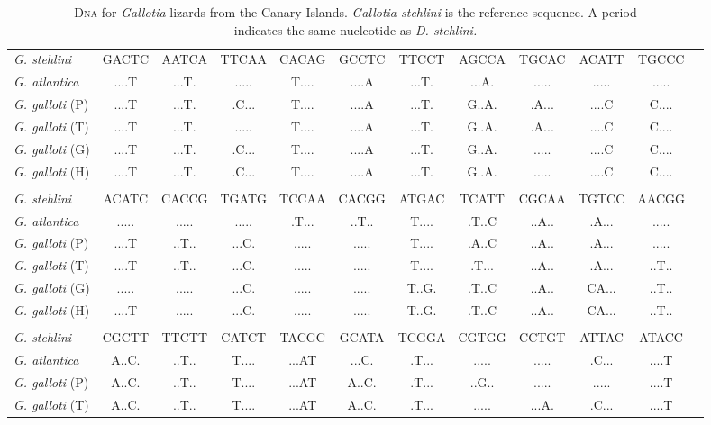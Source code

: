 \documentclass[12pt, hidelinks]{exam}
\begin{document}
\begin{landscape}

{\fontsize{11pt}{13pt}\selectfont
\dnatable
\begin{longtable}[l]{lccccccccccc}
\caption{D\textsc{na} for \textit{Gallotia} lizards from the Canary Islands. \textit{Gallotia stehlini} is the reference sequence. A period \\indicates the same nucleotide as \textit{D. stehlini.}\label{tab:dna_results}}\tabularnewline
\toprule
{\regfont\textit{G. stehlini}}	& GACTC & AATCA & TTCAA & CACAG & GCCTC & TTCCT & AGCCA & TGCAC & ACATT & TGCCC \tabularnewline
{\regfont\textit{G. atlantica}}	& ....T & ...T. & ..... & T.... & ....A & ...T. & ...A. & ..... & ..... & ..... \tabularnewline
{\regfont\textit{G. galloti} (P)}	& ....T & ...T. & .C... & T.... & ....A & ...T. & G..A. & .A... & ....C & C.... \tabularnewline
{\regfont\textit{G. galloti} (T)}	& ....T & ...T. & ..... & T.... & ....A & ...T. & G..A. & .A... & ....C & C.... \tabularnewline
{\regfont\textit{G. galloti} (G)}	& ....T & ...T. & .C... & T.... & ....A & ...T. & G..A. & ..... & ....C & C.... \tabularnewline
{\regfont\textit{G. galloti} (H)}	& ....T & ...T. & .C... & T.... & ....A & ...T. & G..A. & ..... & ....C & C.... \tabularnewline%
&&&&&&&&&&\tabularnewline
{\regfont\textit{G. stehlini}}	& ACATC & CACCG & TGATG & TCCAA & CACGG & ATGAC & TCATT & CGCAA & TGTCC & AACGG \tabularnewline
{\regfont\textit{G. atlantica}}	& ..... & ..... & ..... & .T... & ..T.. & T.... & .T..C & ..A.. & .A... & ..... \tabularnewline
{\regfont\textit{G. galloti} (P)}	& ....T & ..T.. & ...C. & ..... & ..... & T.... & .A..C & ..A.. & .A... & ..... \tabularnewline
{\regfont\textit{G. galloti} (T)}	& ....T & ..T.. & ...C. & ..... & ..... & T.... & .T... & ..A.. & .A... & ..T.. \tabularnewline
{\regfont\textit{G. galloti} (G)}	& ..... & ..... & ...C. & ..... & ..... & T..G. & .T..C & ..A.. & CA... & ..T.. \tabularnewline
{\regfont\textit{G. galloti} (H)}	& ....T & ..... & ...C. & ..... & ..... & T..G. & .T..C & ..A.. & CA... & ..T.. \tabularnewline
&&&&&&&&&&\tabularnewline
{\regfont\textit{G. stehlini}}	& CGCTT & TTCTT & CATCT & TACGC & GCATA & TCGGA & CGTGG & CCTGT & ATTAC & ATACC \tabularnewline
{\regfont\textit{G. atlantica}}	& A..C. & ..T.. & T.... & ...AT & ...C. & .T... & ..... & ..... & .C... & ....T \tabularnewline
{\regfont\textit{G. galloti} (P)}	& A..C. & ..T.. & T.... & ...AT & A..C. & .T... & ..G.. & ..... & ..... & ....T \tabularnewline
{\regfont\textit{G. galloti} (T)}	& A..C. & ..T.. & T.... & ...AT & A..C. & .T... & ..... & ...A. & .C... & ....T \tabularnewline

\end{longtable}}
\end{landscape}
\end{document}
